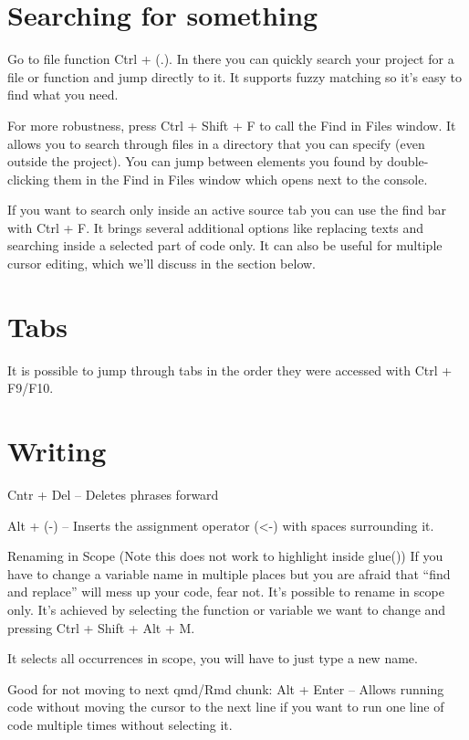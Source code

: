 \documentclass[
  letterpaper,
  DIV=11,
  numbers=noendperiod,
  oneside]{scrreprt}
\begin{document}
\hypertarget{searching-for-something}{%
\section{Searching for something}\label{searching-for-something}}

Go to file function Ctrl + (.). In there you can quickly search your
project for a file or function and jump directly to it. It supports
fuzzy matching so it's easy to find what you need.

For more robustness, press Ctrl + Shift + F to call the Find in Files
window. It allows you to search through files in a directory that you
can specify (even outside the project). You can jump between elements
you found by double-clicking them in the Find in Files window which
opens next to the console.

If you want to search only inside an active source tab you can use the
find bar with Ctrl + F. It brings several additional options like
replacing texts and searching inside a selected part of code only. It
can also be useful for multiple cursor editing, which we'll discuss in
the section below.

\hypertarget{tabs}{%
\section{Tabs}\label{tabs}}

It is possible to jump through tabs in the order they were accessed with
Ctrl + F9/F10.

\hypertarget{writing}{%
\section{Writing}\label{writing}}

Cntr + Del -- Deletes phrases forward

Alt + (-) -- Inserts the assignment operator (\textless-) with spaces
surrounding it.

Renaming in Scope (Note this does not work to highlight inside glue())
If you have to change a variable name in multiple places but you are
afraid that ``find and replace'' will mess up your code, fear not. It's
possible to rename in scope only. It's achieved by selecting the
function or variable we want to change and pressing Ctrl + Shift + Alt +
M.

It selects all occurrences in scope, you will have to just type a new
name.

Good for not moving to next qmd/Rmd chunk: Alt + Enter -- Allows running
code without moving the cursor to the next line if you want to run one
line of code multiple times without selecting it.
\end{document}
